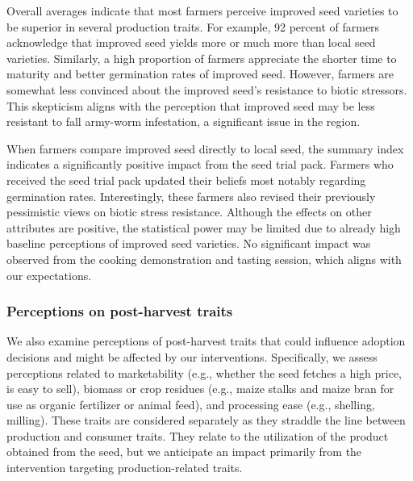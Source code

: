 \documentclass[english]{article}\usepackage[]{graphicx}\usepackage[]{xcolor}
\begin{document}
Overall averages indicate that most farmers perceive improved seed
varieties to be superior in several production traits. For example,
92
percent of farmers acknowledge that improved seed yields more or much
more than local seed varieties. Similarly, a high proportion of farmers
appreciate the shorter time to maturity and better germination rates
of improved seed. However, farmers are somewhat less convinced about
the improved seed's resistance to biotic stressors. This skepticism
aligns with the perception that improved seed may be less resistant
to fall army-worm infestation, a significant issue in the region.

When farmers compare improved seed directly to local seed, the summary
index indicates a significantly positive impact from the seed trial
pack. Farmers who received the seed trial pack updated their beliefs
most notably regarding germination rates. Interestingly, these farmers
also revised their previously pessimistic views on biotic stress resistance.
Although the effects on other attributes are positive, the statistical
power may be limited due to already high baseline perceptions of improved
seed varieties. No significant impact was observed from the cooking
demonstration and tasting session, which aligns with our expectations.

\subsubsection{Perceptions on post-harvest traits}

We also examine perceptions of post-harvest traits that could influence
adoption decisions and might be affected by our interventions. Specifically,
we assess perceptions related to marketability (e.g., whether the
seed fetches a high price, is easy to sell), biomass or crop residues
(e.g., maize stalks and maize bran for use as organic fertilizer or
animal feed), and processing ease (e.g., shelling, milling). These
traits are considered separately as they straddle the line between
production and consumer traits. They relate to the utilization of
the product obtained from the seed, but we anticipate an impact primarily
from the intervention targeting production-related traits.
\end{document}
